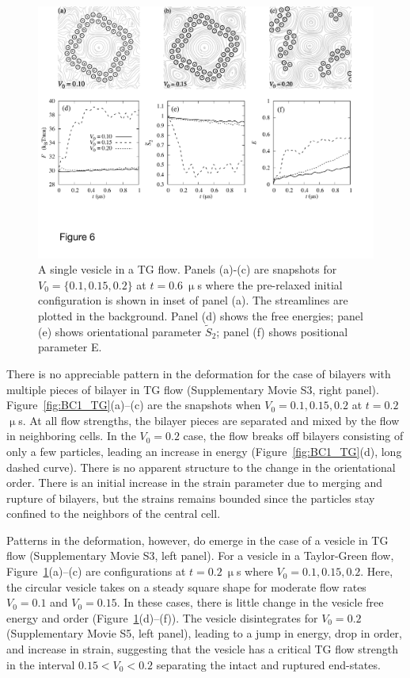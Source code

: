 \documentclass[prb,preprint,showpacs,preprintnumbers,amsmath,amssymb,longbibliography]{revtex4-1}
\begin{document}
\begin{figure}
  \begin{center}
    \includegraphics[width=1.0\textwidth]{Figures/Figure6.pdf}        
  \end{center}
\caption{\label{fig:ves_TG} A single vesicle in a TG flow. Panels
  (a)-(c) are snapshots for $V_0=\{0.1, 0.15, 0.2\}$ at $t=0.6\ \upmu$s
  where the pre-relaxed initial configuration is shown in inset of panel
  (a). The streamlines are plotted in the background. Panel (d) shows
  the free energies; panel (e) shows orientational parameter
  $\tilde{S}_2$; panel (f) shows positional parameter E.}
\end{figure}


There is no appreciable pattern in the deformation for the
case of bilayers with multiple pieces of bilayer in TG flow
(Supplementary Movie S3, right panel).
Figure~\ref{fig:BC1_TG}(a)--(c)
are the snapshots when $V_0=0.1,0.15,0.2$ at $t = 0.2$ $\upmu$s. At all
flow strengths, the bilayer pieces are separated and mixed by the
flow in neighboring cells. In the $V_0 = 0.2$ case, the flow breaks off
bilayers consisting of only a few particles, leading an increase in
energy (Figure~\ref{fig:BC1_TG}(d), long dashed curve). There is no
apparent structure to the change in the orientational order. There is an initial
increase in the strain parameter due to merging and rupture of bilayers, but the
strains remains bounded since the particles stay confined to the
neighbors of the central cell.


Patterns in the deformation, however, do emerge in the case of a vesicle
in TG flow (Supplementary Movie S3, left panel). For a vesicle in a Taylor-Green flow,
Figure~\ref{fig:ves_TG}(a)--(c) are configurations at $t=0.2\ \upmu$s
where $V_0=0.1,0.15,0.2$. Here, the circular vesicle takes on a steady
square shape for moderate flow rates $V_0 = 0.1$ and $V_0 = 0.15$. In
these cases, there is little change in the vesicle free energy and order
(Figure~\ref{fig:ves_TG}(d)--(f)). The vesicle disintegrates for $V_0 =
0.2$ (Supplementary Movie S5, left panel), leading to a jump in energy, drop in order, and increase in
strain, suggesting that the vesicle has a critical TG flow strength in
the interval $0.15 < V_0 <  0.2$ separating the intact and ruptured
end-states.
\end{document}
